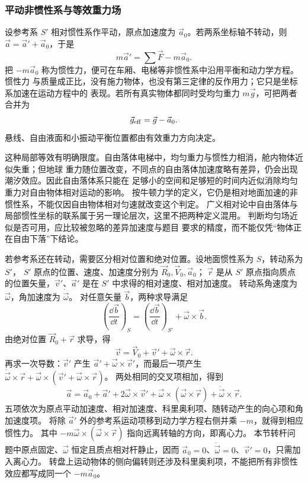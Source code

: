 \subsubsection*{平动非惯性系与等效重力场}

设参考系 $S'$ 相对惯性系作平动，原点加速度为 $\vec a_0$。若两系坐标轴不转动，则
$\vec a=\vec a'+\vec a_0$，于是
\begin{equation}
 m\vec a'=\sum\vec F-m\vec a_0.
\end{equation}
把 $-m\vec a_0$ 称为惯性力，便可在车厢、电梯等非惯性系中沿用平衡和动力学方程。惯性力
与质量成正比，没有施力物体，也没有第三定律的反作用力；它只是坐标系加速在运动方程中的
表现。若所有真实物体都同时受均匀重力 $m\vec g$，可把两者合并为
\begin{equation}
 \vec g_{\rm eff}=\vec g-\vec a_0.
\end{equation}
悬线、自由液面和小振动平衡位置都由有效重力方向决定。

这种局部等效有明确限度。自由落体电梯中，均匀重力与惯性力相消，舱内物体近似失重；但地球
重力随位置改变，不同点的自由落体加速度略有差异，仍会出现潮汐效应。因此自由落体系只能在
足够小的空间和足够短的时间内近似消除均匀重力对自由物体相对运动的影响。
按牛顿力学的定义，它仍是相对地面加速的非惯性系，不能仅因自由物体相对匀速就改变这个判定。
广义相对论中自由落体与局部惯性坐标的联系属于另一理论层次，这里不把两种定义混用。
判断均匀场近似是否可用，应比较被忽略的差异加速度与题目
要求的精度，而不能仅凭“物体正在自由下落”下结论。

若参考系还在转动，需要区分相对位置和绝对位置。设地面惯性系为 $S$，转动系为 $S'$，
$S'$ 原点的位置、速度、加速度分别为 $\vec R_0,\vec V_0,\vec a_0$；
$\vec r$ 是从 $S'$ 原点指向质点的位置矢量，$\vec v'$、$\vec a'$ 是在 $S'$ 中求得的相对速度、相对加速度。
转动系角速度为 $\vec\omega$，角加速度为 $\dot{\vec\omega}$。
对任意矢量 $\vec b$，两种求导满足
\[
 \left(\frac{\dd\vec b}{\dd t}\right)_S
 =\left(\frac{\dd\vec b}{\dd t}\right)_{S'}+\vec\omega\times\vec b.
\]
由绝对位置 $\vec R_0+\vec r$ 求导，得
\[
 \vec v=\vec V_0+\vec v'+\vec\omega\times\vec r.
\]
再求一次导数：$\vec v'$ 产生 $\vec a'+\vec\omega\times\vec v'$，而最后一项产生
$\dot{\vec\omega}\times\vec r+\vec\omega\times(\vec v'+\vec\omega\times\vec r)$。
两处相同的交叉项相加，得到
\begin{equation}
 \vec a=\vec a_0+\vec a'+2\vec\omega\times\vec v'
 +\vec\omega\times(\vec\omega\times\vec r)
 +\dot{\vec\omega}\times\vec r.
\end{equation}
五项依次为原点平动加速度、相对加速度、科里奥利项、随转动产生的向心项和角加速度项。
将除 $\vec a'$ 外的参考系运动项移到动力学方程右侧并乘 $-m$，就得到相应惯性力。
其中 $-m\vec\omega\times(\vec\omega\times\vec r)$ 指向远离转轴的方向，即离心力。
本节转杆问题中原点固定、$\vec\omega$ 恒定且质点相对杆静止，因而
$\vec a_0=0$、$\dot{\vec\omega}=0$、$\vec v'=0$，只需加入离心力。
转盘上运动物体的侧向偏转则还涉及科里奥利项，不能把所有非惯性效应都写成同一个 $-m\vec a_0$。
